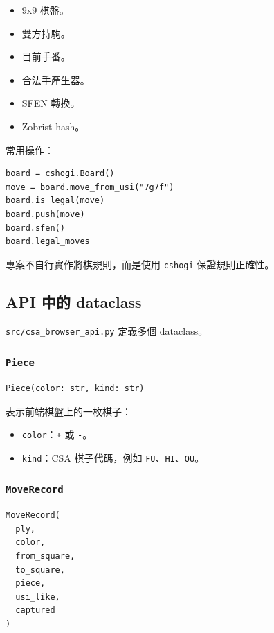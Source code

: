 \documentclass[12pt,a4paper,fontset=none]{ctexart}
\begin{document}
\begin{itemize}
  \item 9x9 棋盤。
  \item 雙方持駒。
  \item 目前手番。
  \item 合法手產生器。
  \item SFEN 轉換。
  \item Zobrist hash。
\end{itemize}

常用操作：

\begin{lstlisting}[style=cmd]
board = cshogi.Board()
move = board.move_from_usi("7g7f")
board.is_legal(move)
board.push(move)
board.sfen()
board.legal_moves
\end{lstlisting}

專案不自行實作將棋規則，而是使用 \texttt{cshogi} 保證規則正確性。

\subsection{API 中的 dataclass}

\texttt{src/csa\_browser\_api.py} 定義多個 dataclass。

\subsubsection{\texttt{Piece}}

\begin{lstlisting}[style=cmd]
Piece(color: str, kind: str)
\end{lstlisting}

表示前端棋盤上的一枚棋子：

\begin{itemize}
  \item \texttt{color}：\texttt{+} 或 \texttt{-}。
  \item \texttt{kind}：CSA 棋子代碼，例如 \texttt{FU}、\texttt{HI}、\texttt{OU}。
\end{itemize}

\subsubsection{\texttt{MoveRecord}}

\begin{lstlisting}[style=cmd]
MoveRecord(
  ply,
  color,
  from_square,
  to_square,
  piece,
  usi_like,
  captured
)
\end{lstlisting}
\end{document}

